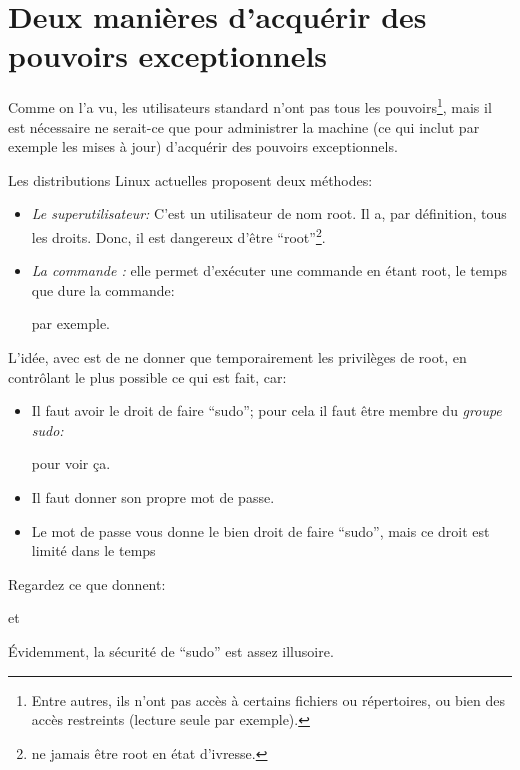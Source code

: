 \section{Deux manières d'acquérir des pouvoirs exceptionnels}
Comme on l'a vu, les utilisateurs \og standard\fg{} n'ont pas tous les
pouvoirs\footnote{Entre autres, ils n'ont pas accès à certains
  fichiers ou répertoires, ou bien des accès restreints (lecture seule
  par exemple).}, mais il est nécessaire ne serait-ce que pour administrer la
machine (ce qui inclut par exemple les mises à jour) d'acquérir des
pouvoirs exceptionnels.

Les distributions Linux actuelles proposent deux méthodes:

\begin{itemize}
\item \emph{Le superutilisateur:}
C'est un utilisateur de  nom  \textsf{root}. Il a, par définition, tous les
droits. Donc, il est dangereux d'être ``root''\footnote{ne jamais être
  root en état d'ivresse.}.
\item \emph{La commande :}
  elle permet d'exécuter une commande en étant root, le temps que dure
  la commande: 


  par exemple.
\end{itemize}

L'idée, avec  est de ne donner que temporairement les
privilèges de root, en contrôlant le plus possible ce qui est fait, car:
\begin{itemize}
  \item Il faut avoir le droit de faire ``sudo''; pour cela il faut
    être membre du \emph{groupe sudo:}


    pour voir ça.

  \item Il faut donner son propre mot de passe.

  \item Le mot de passe vous donne le bien droit de faire ``sudo'', mais ce
    droit est limité dans le temps
\end{itemize}

Regardez ce que donnent:


et

    

Évidemment, la sécurité de ``sudo'' est assez illusoire.

